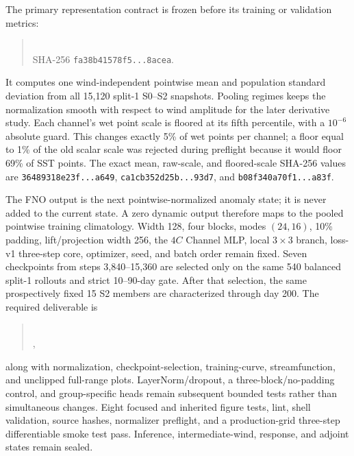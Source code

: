 \documentclass[11pt]{article}
\begin{document}
The primary representation contract is frozen before its training or validation
metrics:
\begin{quote}
\\
SHA-256 \texttt{fa38b41578f5...8acea}.
\end{quote}
It computes one wind-independent pointwise mean and population standard deviation from
all 15,120 split-1 S0--S2 snapshots.  Pooling regimes keeps the normalization smooth
with respect to wind amplitude for the later derivative study.  Each channel's wet
point scale is floored at its fifth percentile, with a \(10^{-6}\) absolute guard.
This changes exactly 5\% of wet points per channel; a floor equal to 1\% of the old
scalar scale was rejected during preflight because it would floor 69\% of SST points.
The exact mean, raw-scale, and floored-scale SHA-256 values are
\texttt{36489318e23f...a649}, \texttt{ca1cb352d25b...93d7}, and
\texttt{b08f340a70f1...a83f}.

The FNO output is the next pointwise-normalized anomaly state; it is never added to the
current state.  A zero dynamic output therefore maps to the pooled pointwise training
climatology.  Width 128, four blocks, modes \((24,16)\), 10\% padding, lift/projection
width 256, the \(4C\) Channel MLP, local \(3\times3\) branch, loss-v1 three-step core,
optimizer, seed, and batch order remain fixed.  Seven checkpoints from steps
3,840--15,360 are selected only on the same 540 balanced split-1 rollouts and strict
10--90-day gate.  After that selection, the same prospectively fixed 15 S2 members are
characterized through day 200.  The required deliverable is
\begin{quote}
\\
,
\end{quote}
along with normalization, checkpoint-selection, training-curve, streamfunction, and
unclipped full-range plots.  LayerNorm/dropout, a three-block/no-padding control, and
group-specific heads remain subsequent bounded tests rather than simultaneous changes.
Eight focused and inherited figure tests, lint, shell validation, source hashes,
normalizer preflight, and a production-grid three-step differentiable smoke test pass.
Inference, intermediate-wind, response, and adjoint states remain sealed.
\end{document}
